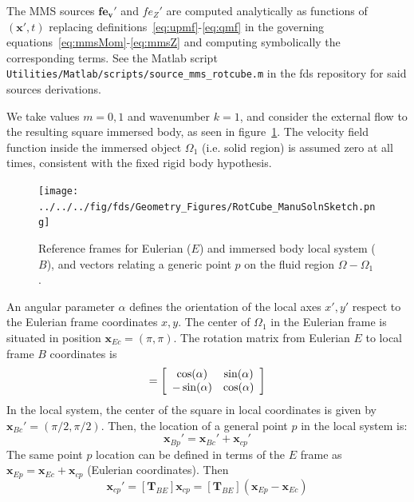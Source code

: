 \documentclass[11pt]{book}
\begin{document}
 The MMS sources $\mathbf{fe_v'}$ and $fe_Z'$ are computed analytically as functions of $(\mathbf{x'},t)$ replacing definitions~\eqref{eq:upmf}-\eqref{eq:qmf} in the governing equations~\eqref{eq:mmsMom}-\eqref{eq:mmsZ} and computing symbolically the corresponding terms. See the Matlab script \texttt{Utilities/Matlab/scripts/source\_mms\_rotcube.m} in the fds repository for said sources derivations.



We take values $m=0,1$ and wavenumber $k=1$, and consider the external flow to the resulting square immersed body, as seen in figure~\ref{Fig:ManuSoln}. The velocity field function inside the immersed object $\Omega_1$ (i.e. solid region) is assumed zero at all times, consistent with the fixed rigid body hypothesis.
%
\begin{figure}[h]
      \centering
      \texttt{[image: ../../../fig/fds/Geometry\_Figures/RotCube\_ManuSolnSketch.png]}
      \caption{Reference frames for Eulerian ($E$) and immersed body local system ($B$), and vectors relating a generic point $p$ on the fluid region $\Omega-\Omega_1$.}
	\label{Fig:ManuSoln}
\end{figure}
%
An angular parameter $\alpha$ defines the orientation of the local axes $x',y'$ respect to the Eulerian frame coordinates $x,y$. The center of $\Omega_1$ in the Eulerian frame is situated in position $\mathbf{x}_{Ec}=(\pi,\pi)$. The rotation matrix from Eulerian $E$ to local frame $B$ coordinates is
%
\begin{equation}
  [\mathbf{T}_{BE}] = \left[ \begin{array}{c c}
                                          \cos(\alpha) & \sin(\alpha) \\
                                         -\sin(\alpha)  & \cos(\alpha) \end{array} \right]
\end{equation}
%
In the local system, the center of the square in local coordinates is given by $\mathbf{x}_{Bc}'=(\pi/2,\pi/2)$. Then, the location of a general point $p$ in the local system is:
%
\begin{equation}
    \mathbf{x}_{Bp}'= \mathbf{x}_{Bc}' +\mathbf{x}_{cp}'
\end{equation}
%
The same point $p$ location can be defined in terms of the $E$ frame as $\mathbf{x}_{Ep}= \mathbf{x}_{Ec} +\mathbf{x}_{cp}$ (Eulerian coordinates). Then
%
\begin{equation}
    \mathbf{x}_{cp}'=[\mathbf{T}_{BE}] \mathbf{x}_{cp}=[\mathbf{T}_{BE}] \left( \mathbf{x}_{Ep} - \mathbf{x}_{Ec} \right)
\end{equation}
\end{document}
